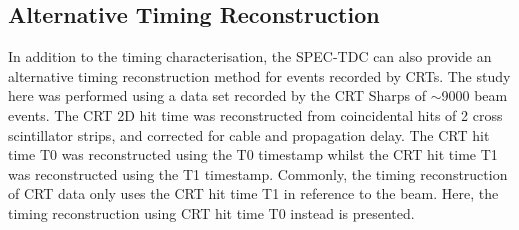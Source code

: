 \subsection{Alternative Timing Reconstruction}
\label{sec:crt_time_alternative}

In addition to the timing characterisation, the SPEC-TDC can also provide an alternative timing reconstruction method for events recorded by CRTs.
The study here was performed using a data set recorded by the CRT Sharps of $\sim$9000 beam events. 
The CRT 2D hit time was reconstructed from coincidental hits of 2 cross scintillator strips, and corrected for cable and propagation delay.
The CRT hit time T0 was reconstructed using the T0 timestamp whilst the CRT hit time T1 was reconstructed using the T1 timestamp. 
Commonly, the timing reconstruction of CRT data only uses the CRT hit time T1 in reference to the beam.
Here, the timing reconstruction using CRT hit time T0 instead is presented.

